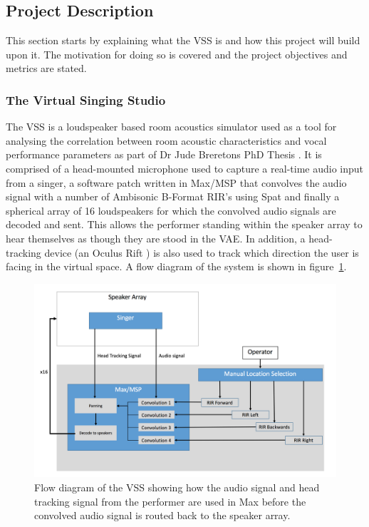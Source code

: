 \documentclass[../../main.tex]{subfiles}
\begin{document}
\subsection{Project Description}
	
	This section starts by explaining what the \ac{VSS} is and how this project will build upon it. The motivation for doing so is covered and the project objectives and metrics are stated.

	\subsubsection{The Virtual Singing Studio}

		The \ac{VSS} is a loudspeaker based room acoustics simulator used as a tool for analysing the correlation between room acoustic characteristics and vocal performance parameters as part of Dr Jude Breretons PhD Thesis \cite{Brereton2014}. It is comprised of a head-mounted microphone used to capture a real-time audio input from a singer, a software patch written in Max/MSP that convolves the audio signal with a number of Ambisonic B-Format \ac{RIR}'s using Spat and finally a spherical array of 16 loudspeakers for which the convolved audio signals are decoded and sent. This allows the performer standing within the speaker array to hear themselves as though they are stood in the \ac{VAE}. In addition, a head-tracking device (an Oculus Rift \cite{oculus}) is also used to track which direction the user is facing in the virtual space. A flow diagram of the system is shown in figure~\ref{vssDiagram}.

	
		\begin{figure}
			\centerline{\includegraphics[scale = 0.45]{Sections/Background/images/vssDiagram.png}}
			\caption{Flow diagram of the VSS showing how the audio signal and head tracking signal from the performer are used in Max before the convolved audio signal is routed back to the speaker array.}
			\label{vssDiagram}
		\end{figure}
\end{document}

